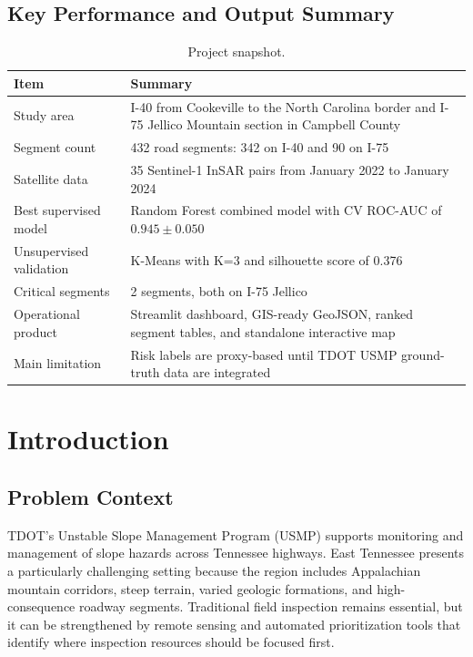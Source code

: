 \documentclass[11pt,letterpaper]{article}
\begin{document}
\subsection*{Key Performance and Output Summary}

\begin{table}[H]
\centering
\caption*{Project snapshot.}
\begin{tabularx}{\linewidth}{L{4.2cm}Y}
\toprule
\textbf{Item} & \textbf{Summary} \\
\midrule
Study area & I-40 from Cookeville to the North Carolina border and I-75 Jellico Mountain section in Campbell County \\
Segment count & 432 road segments: 342 on I-40 and 90 on I-75 \\
Satellite data & 35 Sentinel-1 InSAR pairs from January 2022 to January 2024 \\
Best supervised model & Random Forest combined model with CV ROC-AUC of $0.945 \pm 0.050$ \\
Unsupervised validation & K-Means with K=3 and silhouette score of 0.376 \\
Critical segments & 2 segments, both on I-75 Jellico \\
Operational product & Streamlit dashboard, GIS-ready GeoJSON, ranked segment tables, and standalone interactive map \\
Main limitation & Risk labels are proxy-based until TDOT USMP ground-truth data are integrated \\
\bottomrule
\end{tabularx}
\end{table}

\newpage
\tableofcontents
\newpage
{}

\section{Introduction}
\label{sec:intro}

\subsection{Problem Context}

TDOT's Unstable Slope Management Program (USMP) supports monitoring and management of slope hazards across Tennessee highways. East Tennessee presents a particularly challenging setting because the region includes Appalachian mountain corridors, steep terrain, varied geologic formations, and high-consequence roadway segments. Traditional field inspection remains essential, but it can be strengthened by remote sensing and automated prioritization tools that identify where inspection resources should be focused first.
\end{document}
